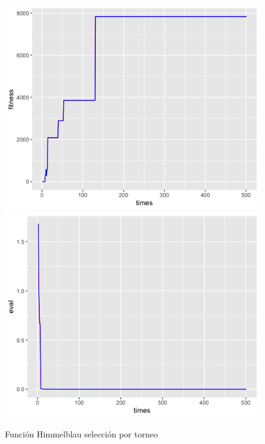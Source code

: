 \documentclass[letterpaper,12pt]{article}
\theoremstyle{definition}
\begin{document}
\begin{figure}[H]
    \includegraphics[width=\linewidth]{him_tour_fitness}
  \endminipage\hfill
    \includegraphics[width=\linewidth]{him_tour_eval}
  \endminipage\hfill
  \caption{Función Himmelblau selección por torneo}
  \label{fig:him_tour}
\end{figure}
\end{document}
